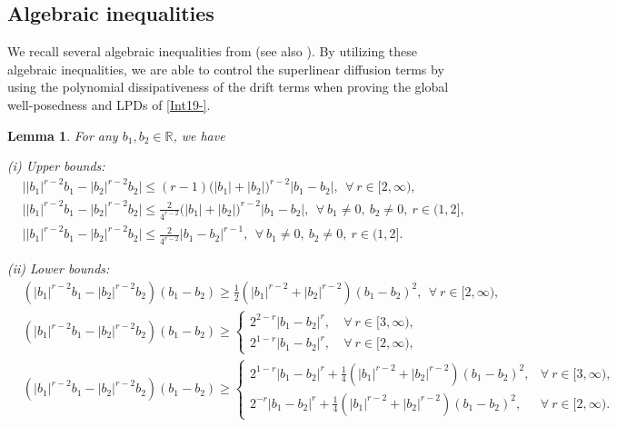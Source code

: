 \documentclass[11pt]{article}
\renewcommand{\leq}{\leqslant}
\renewcommand{\geq}{\geqslant}  %
\newtheorem{lemma}[theorem]{Lemma}
\numberwithin{equation}{section}
\begin{document}
\subsection{Algebraic inequalities}
We recall several algebraic inequalities from \cite{RWangsubmitted} (see also \cite{Brasco1}).
By utilizing these algebraic inequalities, we are able to control the superlinear
diffusion terms by using the  polynomial dissipativeness of the drift terms when proving the global well-posedness and LPDs of \eqref{Int19-}.


\begin{lemma}\label{AlgebraicA}
For any $b_1,b_2\in\mathbb{R}$, we have

(i) Upper bounds:
\begin{subequations}
\begin{align}&\label{Algebraic1}\big||b_1|^{r-2}b_1
		-|b_2|^{r-2}b_2\big|\leq (r-1)\big(|b_1|
		+|b_2|\big)^{r-2}|b_1-b_2|, \ \  \forall\ r\in[2,\infty),
\\&\label{Algebraic2}\big||b_1|^{r-2}b_1
		-|b_2|^{r-2}b_2\big|\leq \frac{2}{4^{r-2}} \big(|b_1|
		+|b_2|\big)^{r-2}|b_1-b_2|, \ \  \forall \ b_1\neq0, \ b_2 \neq 0, \ r\in(1,2],
\\&\label{Algebraic2a}\big||b_1|^{r-2}b_1
		-|b_2|^{r-2}b_2\big|\leq \frac{2}{4^{r-2}} |b_1-b_2|^{r-1}, \ \
		\forall \
		 b_1\neq0, \ b_2 \neq 0,
		 \
		  r\in(1,2].
\end{align}
\end{subequations}



(ii) Lower bounds:
\begin{subequations}
\begin{align}\label{Algebraic5}
&(|b_1|^{r-2}b_1-|b_2|^{r-2}b_2)(b_1-b_2)
\geq\frac{1}{2}(|b_1|^{r-2}+|b_2|^{r-2})
(b_1-b_2)^2,
\  \  \forall \  r\in[2,\infty),
\\&\label{Algebraic6}(|b_1|^{r-2}b_1-|b_2|
^{r-2}b_2)(b_1-b_2)
\geq \left \{
\begin{array}{ll}
 2^{2-r}|b_1-b_2|^r,  & \  \forall\ r\in[3,\infty),\\
  2^{1-r}|b_1-b_2|^r,  & \   \forall\ r\in[2,\infty),
  \end{array}
  \right.
\\&\label{Algebraic7}(|b_1|^{r-2}b_1-
|b_2|^{r-2}b_2)(b_1-b_2)
\geq
\left \{
\begin{array}{ll}
2^{1-r}|b_1-b_2|^r
+\frac{1}{4}(|b_1|^{r-2}+|b_2|^{r-2})(b_1-b_2)^2,
 &  \forall\ r\in[3,\infty),\\
 2^{-r}|b_1-b_2|^r
+\frac{1}{4}(|b_1|^{r-2}+|b_2|^{r-2})(b_1-b_2)^2,
 &  \forall\ r\in[2,\infty).
 \end{array}
 \right.
\end{align}
\end{subequations}

\end{lemma}
\end{document}
